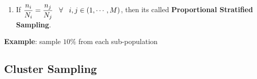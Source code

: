 \begin{enumerate}[itemsep=0.3cm]
    \item If $
        \dfrac{n_i}{N_i} = \dfrac{n_j}{N_j} 
        \hspace{0.3cm} 
        \forall 
        \hspace{0.3cm} 
        i,j \in \left(1,\cdots,M\right) 
    $, then its called \textbf{Proportional Stratified Sampling}.\label{Sampling Plans/Representative Sampling/Stratified Sampling/Proportional Stratified Sampling}
    \hfill \cite{statistics/book/Statistics-for-Data-Scientists/Maurits-Kaptein}

\end{enumerate}


\vspace{0.5cm}
\textbf{Example}: sample $10\%$ from each sub-population







\subsection{Cluster Sampling \cite{statistics/book/Statistics-for-Data-Scientists/Maurits-Kaptein}}\label{Sampling Plans/Representative Sampling/Cluster Sampling}

